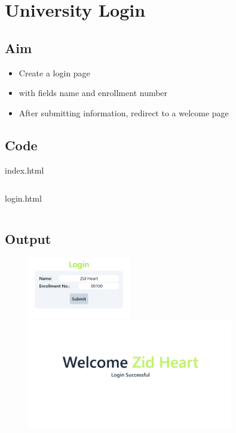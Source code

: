 \documentclass{article}
\begin{document}
\section{University Login}
\subsection{Aim}
\begin{itemize}
	\item Create a login page
	\item with fields name and enrollment number
	\item After submitting information, redirect to a welcome page
\end{itemize}

\subsection{Code}
index.html
\inputminted[frame=lines, linenos, breaklines, breakanywhere, numberblanklines=false]{html}{./prog_11/index.html}
\newpage
login.html
\inputminted[frame=lines, linenos, breaklines, breakanywhere, numberblanklines=false]{html}{./prog_11/login.html}

\subsection{Output}
\begin{figure}[h!]
	\centering
	\includegraphics[width=0.4\textwidth]{./Assets/p1101.png}
	\includegraphics[width=0.8\textwidth]{./Assets/p1102.png}
\end{figure}
\newpage
\end{document}

